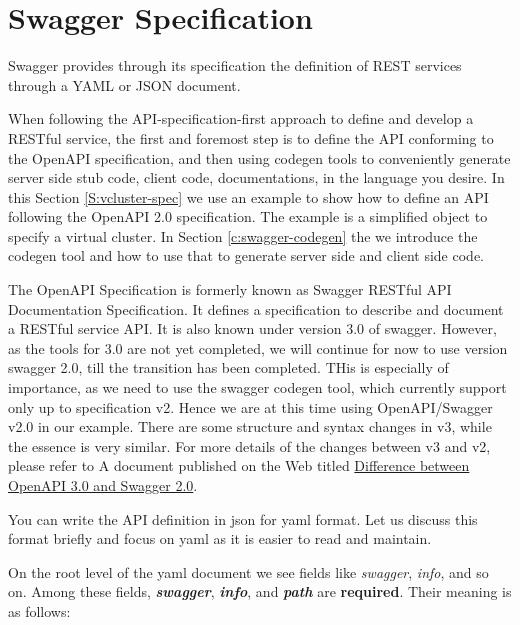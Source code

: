 \section{Swagger Specification}\label{S:swagger-specification}

Swagger provides through its specification the definition of REST
services through a YAML or JSON document. 

When following the API-specification-first approach to define and
develop a RESTful service, the first and foremost step is to define
the API conforming to the OpenAPI specification, and then using
codegen tools to conveniently generate server side stub code, client
code, documentations, in the language you desire. In this Section
\ref{S:vcluster-spec} we use an example to show how to define an API
following the OpenAPI 2.0 specification. The example is a simplified
object to specify a virtual cluster. In Section
\ref{c:swagger-codegen} the we introduce the codegen tool and how to
use that to generate server side and client side code.

The OpenAPI Specification is formerly known as Swagger RESTful API
Documentation Specification. It defines a specification to describe
and document a RESTful service API. It is also known under version 3.0
of swagger. However, as the tools for 3.0 are not yet completed, we
will continue for now to use version swagger 2.0, till the transition
has been completed. THis is especially of importance, as we need to
use the swagger codegen tool, which currently support only up to
specification v2. Hence we are at this time using OpenAPI/Swagger v2.0
in our example. There are some structure and syntax changes in v3,
while the essence is very similar. For more details of the
changes between v3 and v2, please refer to A document published on the
Web titled
\href{https://blog.readme.io/an-example-filled-guide-to-swagger-3-2/}{Difference
  between OpenAPI 3.0 and Swagger 2.0}.

You can write the API definition in json for yaml format. Let us
discuss this format briefly and focus on yaml as it is easier to read
and maintain.

On the root level of the yaml document we see fields like
\emph{swagger}, \emph{info}, and so on. Among these fields,
\textbf{\emph{swagger}}, \textbf{\emph{info}}, and \textbf{\emph{path}}
are \textbf{required}. Their meaning is as follows:

